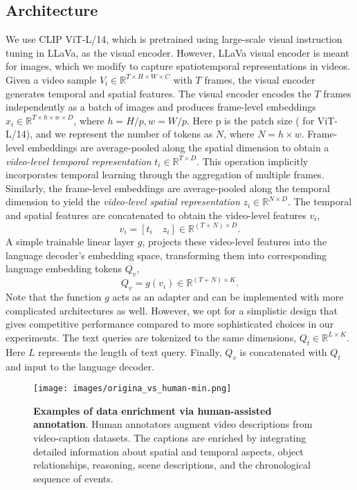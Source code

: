 \subsection{Architecture}
We use CLIP ViT-L/14, which is pretrained using large-scale visual instruction tuning in LLaVa, as the visual encoder. However, LLaVa visual encoder is meant for images, which we modify to capture spatiotemporal representations in videos. Given a video sample $V_i \in \mathbb{R}^{T \times H \times W  \times C}$ with $T$ frames, the visual encoder generates temporal and spatial features.
The visual encoder encodes the $T$ frames independently as a batch of images and produces frame-level embeddings $x_i \in \mathbb{R}^{T \times h \times w \times D}$, where $h=H/p, w=W/p$. Here p is the patch size ( for ViT-L/14), and we represent the number of tokens as $N$, where $N = h \times w$. Frame-level embeddings are average-pooled along the spatial dimension to obtain a \textit{video-level temporal representation} $t_{i} \in \mathbb{R}^{T \times D}$. This operation implicitly incorporates temporal learning through the aggregation of multiple frames. Similarly, the frame-level embeddings are average-pooled along the temporal dimension to yield the \textit{video-level spatial representation} $z_{i} \in \mathbb{R}^{N \times D}$. The temporal and spatial features are concatenated to obtain the video-level features $v_{i}$, 
\begin{equation}
    v_{i} = [t_{i} \quad z_{i}] \in \mathbb{R}^{(T+N) \times D}.
\end{equation}
A simple trainable linear layer $g$, projects these video-level features into the language decoder's embedding space, transforming them into corresponding language embedding tokens $Q_{v}$,
\begin{equation}
    Q_{v} = g(v_{i}) \in \mathbb{R}^{(T+N) \times K} .
\end{equation}
Note that the function $g$ acts as an adapter and can be implemented with more complicated architectures as well. However, we opt for a simplistic design that gives competitive performance compared to more sophisticated choices in our experiments. 
The text queries are tokenized to the same dimensions, $Q_{t} \in \mathbb{R}^{L\times K}$. Here $L$ represents the length of text query.
Finally, $Q_{v}$ is concatenated with $Q_{t}$ and input to the language decoder.

\begin{figure*}[t]
  \centering
  \texttt{[image: images/origina\_vs\_human-min.png]}
  \caption{\textbf{Examples of data enrichment via human-assisted annotation}. Human annotators augment video descriptions from video-caption datasets. The captions are enriched by integrating detailed information about spatial and temporal aspects, object relationships, reasoning, scene descriptions, and the chronological sequence of events.}
  \label{fig:human_assisted}
\end{figure*}

